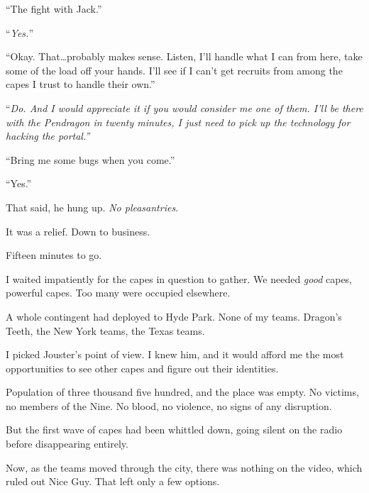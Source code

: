 ``The fight with Jack.''



``\emph{Yes.}''



``Okay.  That\ldots probably makes sense.  Listen, I'll handle what I can from here, take some of the load off your hands.  I'll see if I can't get recruits from among the capes I trust to handle their own.''



``\emph{Do.  And I would appreciate it if you would consider me one of them.  I'll be there }\emph{with the Pendragon in twenty minutes, I just need to pick up the technology for hacking the portal.''}



``Bring me some bugs when you come.''



``Yes.''



That said, he hung up.  \emph{No pleasantries}.



It was a relief.  Down to business.



\sectionbreak



Fifteen minutes to go.



I waited impatiently for the capes in question to gather.  We needed \emph{good} capes, powerful capes.  Too many were occupied elsewhere.



A whole contingent had deployed to Hyde Park.  None of my teams.  Dragon's Teeth, the New York teams, the Texas teams.



I picked Jouster's point of view.  I knew him, and it would afford me the most opportunities to see other capes and figure out their identities.



Population of three thousand five hundred, and the place was empty.  No victims, no members of the Nine.  No blood, no violence, no signs of any disruption.



But the first wave of capes had been whittled down, going silent on the radio before disappearing entirely.



Now, as the teams moved through the city, there was nothing on the video, which ruled out Nice Guy.  That left only a few options.



